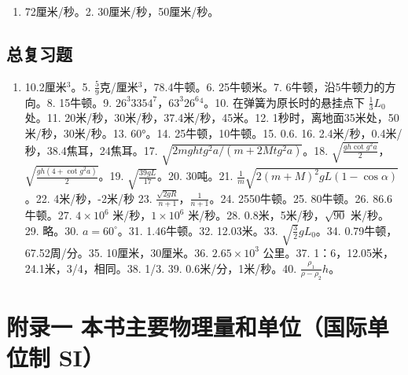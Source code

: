 \begin{enumerate}
\def\labelenumi{\arabic{enumi}.}
\tightlist
\item
  72厘米/秒。2. 30厘米/秒，50厘米/秒。
\end{enumerate}

\section{总复习题}\label{ux603bux590dux4e60ux9898-1}

\begin{enumerate}
\def\labelenumi{\arabic{enumi}.}
\setcounter{enumi}{3}
\tightlist
\item
  10.2厘米\(^{3}\)。5. \(\frac{5}{9}\)克/厘米\(^{3}\)，78.4牛顿。6.
  25牛顿米。7. 6牛顿，沿5牛顿力的方向。8. 15牛顿。9.
  \(26^{3}3354^{7}\)，\(63^{3}26^{6}\)\(^{4}\)。10.
  在弹簧为原长时的悬挂点下 \(\frac{1}{3}L_{0}\)处。11.
  20米/秒，30米/秒，37.4米/秒，45米。12.
  1秒时，离地面35米处，50米/秒，30米/秒。13. 60°。14.
  25牛顿，10牛顿。15. 0.6. 16. 2.4米/秒，0.4米/秒，38.4焦耳，24焦耳。17.
  \(\sqrt{2mgh tg^{2}a/(m+2M tg^{2}a)}\)。18.
  \(\sqrt{\frac{gh\cot g^{2}a}{2}}\)，\(\sqrt{\frac{gh(4+\cot g^{2}a)}{2}}\)。19.
  \(\sqrt{\frac{39gL}{17}}\)。20. 30吨。21.
  \(\frac{1}{m}\sqrt{2(m+M)^{2}gL(1-\cos\alpha)}\)。22. 4米/秒，-2米/秒
  23. \(\frac{\sqrt{2gR}}{n+1}\)，\(\frac{1}{n+1}\)。24. 2550牛顿。25.
  80牛顿。26. 86.6牛顿。27. \(4\times10^{6}\) 米/秒，\(1\times10^{6}\)
  米/秒。28. 0.8米，5米/秒，\(\sqrt{90}\) 米/秒。29. 略。30.
  \(a=60^{\circ}\)。31. 1.46牛顿。32. 12.03米。33.
  \(\sqrt{\frac{3}{2}}gL_{0}\)。34. 0.79牛顿，67.52周/分。35.
  10厘米，30厘米。36. \(2.65\times10^{3}\) 公里。37.
  1：6，12.05米，24.1米，3/4，相同。38. 1/3. 39. 0.6米/分，1米/秒。40.
  \(\frac{\rho_{1}}{\rho-\rho_{2}}h\)。
\end{enumerate}

\chapter{附录一 本书主要物理量和单位（国际单位制
SI）}\label{ux9644ux5f55ux4e00-ux672cux4e66ux4e3bux8981ux7269ux7406ux91cfux548cux5355ux4f4dux56fdux9645ux5355ux4f4dux5236-si}

